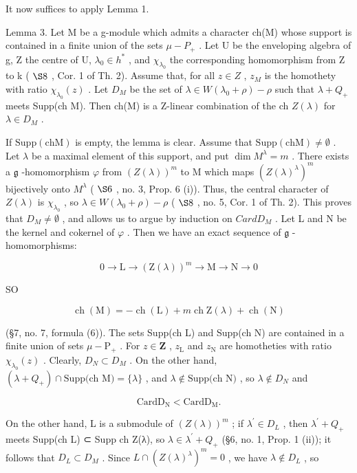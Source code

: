 It now suffices to apply Lemma 1.

Lemma 3. Let M be a g-module which admits a character ch(M) whose support is contained in a finite union of the sets \(\mu-P_{+}\) . Let U be the enveloping algebra of g, Z the centre of U, \(\lambda_{0}\in h^{*}\) , and \(\chi_{\lambda_{0}}\) the corresponding homomorphism from Z to k ( \(\S8\) , Cor. 1 of Th. 2). Assume that, for all \(z\in Z\) , \(z_{M}\) is the homothety with ratio \(\chi_{\lambda_{0}}(z)\) . Let \(D_{M}\) be the set of \(\lambda\in W(\lambda_{0}+\rho)-\rho\) such that \(\lambda+Q_{+}\) meets Supp(ch M). Then ch(M) is a Z-linear combination of the ch \(Z(\lambda)\) for \(\lambda\in D_{M}\) .

If \(\mathrm{Supp(chM)}\) is empty, the lemma is clear. Assume that \(\mathrm{Supp(chM)} \neq \emptyset\) . Let \(\lambda\) be a maximal element of this support, and put \(\dim M^{\lambda} = m\) . There exists a \(\mathfrak{g}\) -homomorphism \(\varphi\) from \((Z(\lambda))^{m}\) to M which maps \((Z(\lambda)^{\lambda})^{m}\) bijectively onto \(M^{\lambda}\) ( \(\S 6\) , no. 3, Prop. 6 (i)). Thus, the central character of \(Z(\lambda)\) is \(\chi_{\lambda_0}\) , so \(\lambda \in W(\lambda_0 + \rho) - \rho\) ( \(\S 8\) , no. 5, Cor. 1 of Th. 2). This proves that \(D_M \neq \emptyset\) , and allows us to argue by induction on \(CardD_M\) . Let L and N be the kernel and cokernel of \(\varphi\) . Then we have an exact sequence of \(\mathfrak{g}\) -homomorphisms:

\[
0 \to \mathrm{L} \to (\mathrm{Z} (\lambda)) ^ {m} \to \mathrm{M} \to \mathrm{N} \to 0
\]

SO

\[
\operatorname{ch} (\mathrm{M}) = - \operatorname{ch} (\mathrm{L}) + m \operatorname{ch} \mathrm{Z} (\lambda) + \operatorname{ch} (\mathrm{N})
\]

(§7, no. 7, formula (6)). The sets Supp(ch L) and Supp(ch N) are contained in a finite union of sets \(\mu -\mathrm{P}_{+}\) . For \(z\in \mathbf{Z}\) , \(z_{\mathrm{L}}\) and \(z_{\mathrm{N}}\) are homotheties with ratio \(\chi_{\lambda_{0}}(z)\) . Clearly, \(D_{N} \subset D_{M}\) . On the other hand, \((\lambda + Q_{+}) \cap \text{Supp(ch M)} = \{\lambda\}\) , and \(\lambda \notin \text{Supp(ch N)}\) , so \(\lambda \notin D_{N}\) and

\[
\mathrm{Card} \mathrm{D} _ {\mathrm{N}} <   \mathrm{Card} \mathrm{D} _ {\mathrm{M}}.
\]

On the other hand, L is a submodule of \((Z(\lambda))^{m}\) ; if \(\lambda^{\prime} \in D_{L}\) , then \(\lambda^{\prime} + Q_{+}\) meets Supp(ch L) ⊂ Supp ch Z(λ), so \(\lambda \in \lambda^{\prime} + Q_{+}\) (§6, no. 1, Prop. 1 (ii)); it follows that \(D_{L} \subset D_{M}\) . Since \(L \cap (Z(\lambda)^{\lambda})^{m} = 0\) , we have \(\lambda \notin D_{L}\) , so

